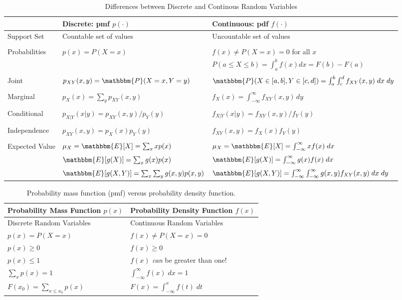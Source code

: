 \documentclass[12pt]{article}
\begin{document}
\pagestyle{empty}


\begin{table}
\onehalfspacing
\centering
	\begin{tabular}{l|ll}
	\hline
  & Discrete: pmf $p(\cdot)$ & Continuous: pdf $f(\cdot)$ \\
	\hline
	Support Set & Countable set of values & Uncountable set of values\\\\
  Probabilities & $p(x) = P(X=x)$ &$f(x) \neq P(X=x)= 0$ for all $x$\\
	&&$P(a\leq X \leq b) = \int_{a}^{b} f(x)dx=F(b) - F(a)$\\\\
  Joint & $p_{XY}(x,y) = \mathbbm{P}(X=x,Y=y)$& $\mathbbm{P}(X\in [a,b],  Y\in [c,d]) = \int_{a}^b \int_{c}^d f_{XY}(x,y)\; dx \; dy$\\ \\
  Marginal & $p_X(x) = \sum_{y} p_{XY}(x,y)$ & $f_X(x) = \int_{-\infty}^{\infty} f_{XY}(x,y) \, dy$\\ \\
  Conditional  & $p_{X|Y}(x|y) = p_{XY}(x,y)/p_Y(y) $ & $f_{X|Y}(x|y) = f_{XY}(x,y)/f_Y(y)$ \\ \\
	 Independence & $p_{XY}(x,y) = p_X(x)p_Y(y)$ & $f_{XY}(x,y) = f_X(x) f_Y(y)$\\\\
	Expected Value & $\mu_X=\mathbbm{E}[X] =\sum_x xp(x)$ &$\mu_X=\mathbbm{E}[X] =\int_{-\infty}^{\infty} xf(x)\; dx$\\
	& $\mathbbm{E}[g(X)] =\sum_x g(x)p(x)$ &$\mathbbm{E}[g(X)] =\int_{-\infty}^{\infty} g(x)f(x)\; dx$\\
  & $\mathbbm{E}[g(X,Y)] =\sum_x \sum_y g(x,y)p(x,y)$ &$\mathbbm{E}[g(X,Y)] =\int_{-\infty}^{\infty}\int_{-\infty}^{\infty} g(x,y)f_{XY}(x,y)\; dx \; dy$\\
	\hline
	\end{tabular}
	\caption{Differences between Discrete and Continous Random Variables}
	
\end{table}




\begin{table}
\onehalfspacing
\centering
\begin{tabular}{l|l}
\hline
Probability Mass Function $p(x)$& Probability Density Function $f(x)$\\
	\hline
	Discrete Random Variables & Continuous Random Variables\\
	$p(x) = P(X=x)$& $f(x) \neq P(X=x)=0$\\
	$p(x)\geq 0$ & $f(x)\geq 0$\\
	$p(x) \leq 1$ & $f(x)$ \emph{can} be greater than one!\\
	$\sum_{x}p(x) = 1$&$\int_{-\infty}^{\infty}f(x)\; dx = 1$\\
	$F(x_0)= \sum_{x\leq x_0} p(x)$& $F(x) = \int_{-\infty}^{x} f(t)\; dt$\\
	\hline
\end{tabular}
\caption{Probability mass function (pmf) versus probability density function.}
\end{table}
\end{document}
